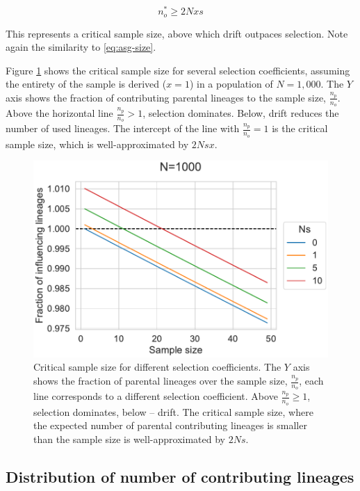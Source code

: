 \documentclass[review]{elsarticle}
\begin{document}
\begin{equation}
  \label{eq:critical-sample}
  n_o^* \ge 2Nxs
\end{equation}

This represents a critical sample size, above which drift outpaces selection.
Note again the similarity to \eqref{eq:asg-size}.

Figure \ref{fig:critical-sample-size} shows the critical sample size for several selection
coefficients, assuming the entirety of the sample is derived ($x=1$) in a population of $N=1,000$.
The $Y$ axis shows the fraction of contributing parental lineages to the sample size,
$\frac{n_p}{n_o}$. Above the horizontal line $\frac{n_p}{n_o} > 1$, selection dominates. Below,
drift reduces the number of used lineages. The intercept of the line with $\frac{n_p}{n_o} = 1$ is
the critical sample size, which is well-approximated by $2Nsx$.

\begin{figure}
  \centering
  \includegraphics{fig/critical_sample_size.pdf}
  \caption{Critical sample size for different selection coefficients. The $Y$ axis shows the
    fraction of parental lineages over the sample size, $\frac{n_p}{n_o}$, each line corresponds to a
    different selection coefficient. Above $\frac{n_p}{n_o}\ge 1$, selection dominates, below -- drift.
    The critical sample size, where the expected number of parental contributing lineages is smaller
    than the sample size is well-approximated by $2Ns$.}
  \label{fig:critical-sample-size}
\end{figure}

\subsection{Distribution of number of contributing lineages}
\label{subsec:distribution}
\end{document}
